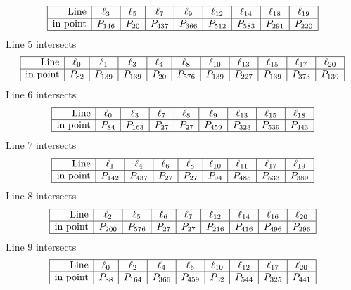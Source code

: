 \documentclass{article}
\begin{document}
{$$\begin{array}{|r*{8}{|c}|}
\hline
\mbox{Line}  & \ell_{3} & \ell_{5} & \ell_{7} & \ell_{9} & \ell_{12} & \ell_{14} & \ell_{18} & \ell_{19}\\
\hline
\mbox{in point}  & P_{146} & P_{20} & P_{437} & P_{366} & P_{512} & P_{583} & P_{291} & P_{220}\\
\hline
\end{array}
$$
Line 5 intersects 
$$
\begin{array}{|r*{10}{|c}|}
\hline
\mbox{Line}  & \ell_{0} & \ell_{1} & \ell_{3} & \ell_{4} & \ell_{8} & \ell_{10} & \ell_{13} & \ell_{15} & \ell_{17} & \ell_{20}\\
\hline
\mbox{in point}  & P_{82} & P_{139} & P_{139} & P_{20} & P_{576} & P_{139} & P_{227} & P_{139} & P_{373} & P_{139}\\
\hline
\end{array}
$$
Line 6 intersects 
$$
\begin{array}{|r*{8}{|c}|}
\hline
\mbox{Line}  & \ell_{0} & \ell_{3} & \ell_{7} & \ell_{8} & \ell_{9} & \ell_{13} & \ell_{15} & \ell_{18}\\
\hline
\mbox{in point}  & P_{84} & P_{163} & P_{27} & P_{27} & P_{459} & P_{323} & P_{539} & P_{443}\\
\hline
\end{array}
$$
Line 7 intersects 
$$
\begin{array}{|r*{8}{|c}|}
\hline
\mbox{Line}  & \ell_{1} & \ell_{4} & \ell_{6} & \ell_{8} & \ell_{10} & \ell_{11} & \ell_{17} & \ell_{19}\\
\hline
\mbox{in point}  & P_{142} & P_{437} & P_{27} & P_{27} & P_{94} & P_{485} & P_{533} & P_{389}\\
\hline
\end{array}
$$
Line 8 intersects 
$$
\begin{array}{|r*{8}{|c}|}
\hline
\mbox{Line}  & \ell_{2} & \ell_{5} & \ell_{6} & \ell_{7} & \ell_{12} & \ell_{14} & \ell_{16} & \ell_{20}\\
\hline
\mbox{in point}  & P_{200} & P_{576} & P_{27} & P_{27} & P_{216} & P_{416} & P_{496} & P_{296}\\
\hline
\end{array}
$$
Line 9 intersects 
$$
\begin{array}{|r*{8}{|c}|}
\hline
\mbox{Line}  & \ell_{0} & \ell_{2} & \ell_{4} & \ell_{6} & \ell_{10} & \ell_{12} & \ell_{17} & \ell_{20}\\
\hline
\mbox{in point}  & P_{88} & P_{164} & P_{366} & P_{459} & P_{32} & P_{544} & P_{325} & P_{441}\\
\hline
\end{array}
$$}
\end{document}
